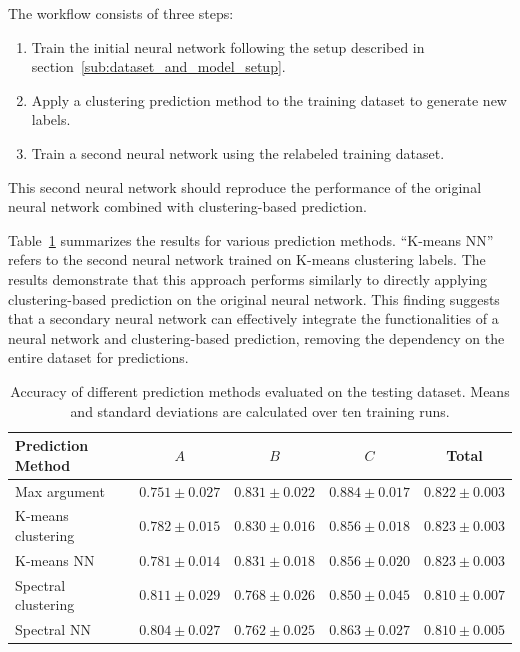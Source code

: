\documentclass[12pt]{article}
\begin{document}
	The workflow consists of three steps:  
	\begin{enumerate}
		\item Train the initial neural network following the setup described in section~\ref{sub:dataset_and_model_setup}.  
		\item Apply a clustering prediction method to the training dataset to generate new labels.  
		\item Train a second neural network using the relabeled training dataset.  
	\end{enumerate}
	This second neural network should reproduce the performance of the original neural network combined with clustering-based prediction.  

	Table~\ref{tab:accuracy_w_different_prediction_dominated_1_combined_nn} summarizes the results for various prediction methods. ``K-means NN'' refers to the second neural network trained on K-means clustering labels. The results demonstrate that this approach performs similarly to directly applying clustering-based prediction on the original neural network. This finding suggests that a secondary neural network can effectively integrate the functionalities of a neural network and clustering-based prediction, removing the dependency on the entire dataset for predictions.  
	\begin{table}[htpb]  
		\centering  
		\caption{Accuracy of different prediction methods evaluated on the testing dataset. Means and standard deviations are calculated over ten training runs.}  
		\label{tab:accuracy_w_different_prediction_dominated_1_combined_nn}  
		\begin{tabular}{l|ccc|c}  
			Prediction Method   & $A$               & $B$               & $C$               & Total             \\ \hline  
			Max argument        & $0.751 \pm 0.027$ & $0.831 \pm 0.022$ & $0.884 \pm 0.017$ & $0.822 \pm 0.003$ \\  
			K-means clustering  & $0.782 \pm 0.015$ & $0.830 \pm 0.016$ & $0.856 \pm 0.018$ & $0.823 \pm 0.003$ \\  
			K-means NN          & $0.781 \pm 0.014$ & $0.831 \pm 0.018$ & $0.856 \pm 0.020$ & $0.823 \pm 0.003$ \\  
			Spectral clustering & $0.811 \pm 0.029$ & $0.768 \pm 0.026$ & $0.850 \pm 0.045$ & $0.810 \pm 0.007$ \\  
			Spectral NN         & $0.804 \pm 0.027$ & $0.762 \pm 0.025$ & $0.863 \pm 0.027$ & $0.810 \pm 0.005$  
		\end{tabular}  
	\end{table}  
\end{document}
